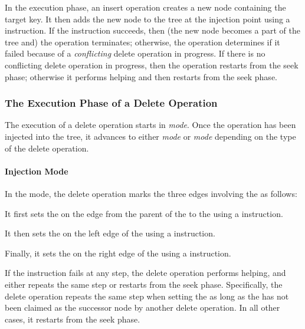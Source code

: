 \begin{limitscope}
\begin{comment}





\end{comment}

In the execution phase, an insert operation creates a new node containing the target key. It then adds the new node to the tree at the injection point using a \CAS{} instruction. If the \CAS{} instruction succeeds, then (the new node becomes a part of the tree and) the operation terminates; otherwise, the operation determines if it failed because of a \emph{conflicting} delete operation in progress. If there is no conflicting delete operation in progress, then the operation restarts from the seek phase; otherwise it performs helping and then restarts from the seek phase.


\subsubsection{The Execution Phase of a Delete Operation}
The execution of a delete operation starts in \emph{\injection{} mode}. Once the operation has been injected into the tree, it advances to either \emph{\discovery{} mode} or \emph{\cleanup{} mode} depending on the type of the delete operation.





\paragraph*{Injection Mode}

In the \injection{} mode, the delete operation marks the three edges involving the \targetnode{} as follows:
\begin{enumerate*}[label=(\roman*)]
\item It first sets the \intentFlag{} on the edge from the parent of the \targetnode{} to the \targetnode{} using a \CAS{} instruction.
\item It then sets the \deleteFlag{} on the left edge of the \targetnode{} using a \CAS{} instruction.
\item Finally, it sets the \deleteFlag{} on the right edge of the \targetnode{} using a \CAS{} instruction.
\end{enumerate*}
If the \CAS{} instruction fails at any step, the delete operation performs helping, and either repeats the same step or restarts from the seek phase. Specifically, the delete operation repeats the same step when setting the \deleteFlag{} as long as the \targetnode{} has not been claimed as the successor node by another delete operation. In all other cases, it restarts from the seek phase.



\end{limitscope}
